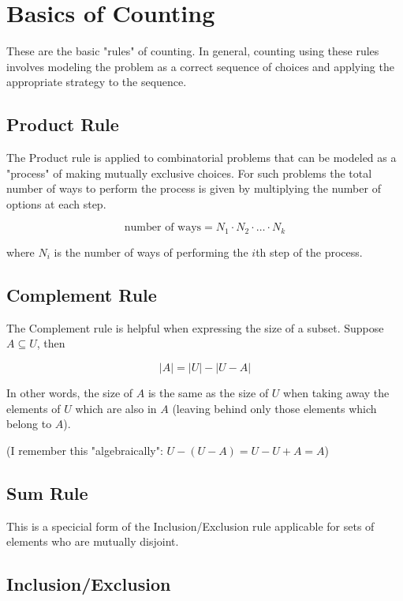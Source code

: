 \documentclass{standlone}
\begin{document}
\section{Basics of Counting}

These are the basic "rules" of counting. In general, counting using these rules
involves modeling the problem as a correct sequence of choices and applying the
appropriate strategy to the sequence.

\subsection{Product Rule}

The Product rule is applied to combinatorial problems that can be modeled as a
"process" of making mutually exclusive choices. For such problems the total
number of ways to perform the process is given by multiplying the number of
options at each step.

\begin{equation}
  \text{number of ways} = N_1 \cdot N_2 \cdot \dots \cdot N_k
\end{equation}

where $N_i$ is the number of ways of performing the $i$th step of the process.

\subsection{Complement Rule}

The Complement rule is helpful when expressing the size of a subset. Suppose
$A \subseteq U$, then

\[
  |A| = |U| - |U - A|
\]

In other words, the size of $A$ is the same as the size of $U$ when taking away
the elements of $U$ which are also in $A$ (leaving behind only those elements
which belong to $A$).

(I remember this "algebraically": $U - (U - A) = U - U + A = A$)

\subsection{Sum Rule}

This is a specicial form of the Inclusion/Exclusion rule applicable for
sets of elements who are mutually disjoint.

\subsection{Inclusion/Exclusion}
\end{document}
